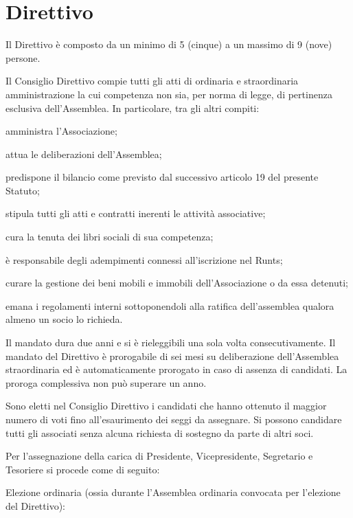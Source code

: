 \documentclass[legalpaper, 11pt]{exam}
\let\tempone\enumerate
\let\temptwo\endenumerate
\renewenvironment{enumerate}{\tempone\addtolength{\itemsep}{-0.45\baselineskip}}{\temptwo}
\begin{document}
{\section{Direttivo}
\begin{enumerate}
 \item Il Direttivo è composto da un minimo di 5 (cinque) a un massimo di 9 (nove) persone.
 \item Il Consiglio Direttivo compie tutti gli atti di ordinaria e straordinaria amministrazione la cui competenza non sia, per norma di legge, di pertinenza esclusiva dell’Assemblea. In particolare, tra gli altri compiti:
\begin{enumerate}
\item amministra l’Associazione;
\item attua le deliberazioni dell’Assemblea;
\item predispone il bilancio come previsto dal successivo articolo 19 del presente Statuto;
\item stipula tutti gli atti e contratti inerenti le attività associative;
\item cura la tenuta dei libri sociali di sua competenza;
\item è responsabile degli adempimenti connessi all’iscrizione nel Runts;
\item curare la gestione dei beni mobili e immobili dell’Associazione o da essa detenuti;
\item emana i regolamenti interni sottoponendoli alla ratifica dell’assemblea qualora almeno un socio lo richieda.
\end{enumerate}
\item Il mandato dura due anni e si è rieleggibili una sola volta consecutivamente. Il mandato del Direttivo è prorogabile di sei mesi su deliberazione dell’Assemblea straordinaria ed è automaticamente prorogato in caso di assenza di candidati. La proroga complessiva non può superare un anno.
\item Sono eletti nel Consiglio Direttivo i candidati che hanno ottenuto il maggior numero di voti fino all’esaurimento dei seggi da assegnare. Si possono candidare tutti gli associati senza alcuna richiesta di sostegno da parte di altri soci.
\item Per l’assegnazione della carica di Presidente, Vicepresidente, Segretario e Tesoriere si procede come di seguito:
\begin{enumerate}
   \item Elezione ordinaria (ossia durante l’Assemblea ordinaria convocata per l’elezione del Direttivo):

\end{enumerate}
\end{enumerate}}
\end{document}
